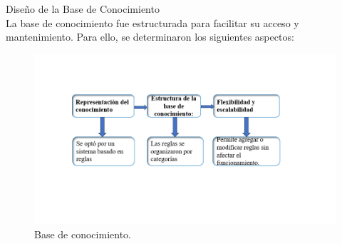 Diseño de la Base de Conocimiento \\
La base de conocimiento fue estructurada para facilitar su acceso y mantenimiento. Para ello, se determinaron los siguientes aspectos: \\

\begin{figure}[H]
    \begin{center}
    \includegraphics[scale = 0.6]{./images/base de conocimiento.png}
    \caption{Base de conocimiento.}
    \label{fig:huella}
    \end{center}
    \end{figure}

